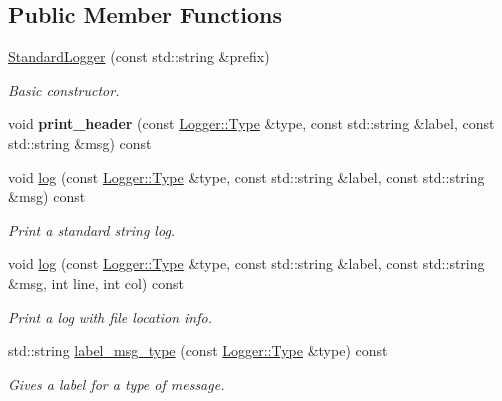\subsection*{Public Member Functions}
\begin{DoxyCompactItemize}
\item 
\mbox{\label{class_standard_logger_aa037227d1766af8b649e46849d466d8c}} 
\mbox{\hyperlink{class_standard_logger_aa037227d1766af8b649e46849d466d8c}{Standard\+Logger}} (const std\+::string \&prefix)
\begin{DoxyCompactList}\small\item\em Basic constructor. \end{DoxyCompactList}\item 
\mbox{\label{class_standard_logger_ad116629c2fb7d023442df24f5c0951a1}} 
void {\bfseries print\+\_\+header} (const \mbox{\hyperlink{class_logger_acd39cb578d7a6750c959f2fad38d8db6}{Logger\+::\+Type}} \&type, const std\+::string \&label, const std\+::string \&msg) const
\item 
void \mbox{\hyperlink{class_standard_logger_a11c29fca1b05d7ff331b298e9c91cd81}{log}} (const \mbox{\hyperlink{class_logger_acd39cb578d7a6750c959f2fad38d8db6}{Logger\+::\+Type}} \&type, const std\+::string \&label, const std\+::string \&msg) const
\begin{DoxyCompactList}\small\item\em Print a standard string log. \end{DoxyCompactList}\item 
void \mbox{\hyperlink{class_standard_logger_a4e63f888143cf77d576056b626f8de00}{log}} (const \mbox{\hyperlink{class_logger_acd39cb578d7a6750c959f2fad38d8db6}{Logger\+::\+Type}} \&type, const std\+::string \&label, const std\+::string \&msg, int line, int col) const
\begin{DoxyCompactList}\small\item\em Print a log with file location info. \end{DoxyCompactList}\item 
std\+::string \mbox{\hyperlink{class_standard_logger_a5803969715008363869dfd47326790bb}{label\+\_\+msg\+\_\+type}} (const \mbox{\hyperlink{class_logger_acd39cb578d7a6750c959f2fad38d8db6}{Logger\+::\+Type}} \&type) const
\begin{DoxyCompactList}\small\item\em Gives a label for a type of message. \end{DoxyCompactList}\end{DoxyCompactItemize}


